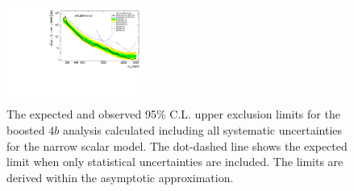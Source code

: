 \begin{figure}
\begin{center}
\includegraphics[width=0.4\textwidth,angle=-90]{figures/boosted/results/BrazilPlot_Asymptotic_s_hh_combined_AllSyst_unblinded_2017-10-04.pdf}
\caption{The expected and observed 95\% C.L. upper exclusion limits for the boosted $4b$ analysis calculated including all systematic uncertainties for the narrow scalar model. The dot-dashed line shows the expected limit when only statistical uncertainties are included. The limits are derived within the asymptotic approximation.}
\label{fig:limit_scalar}
\end{center}
\end{figure}

